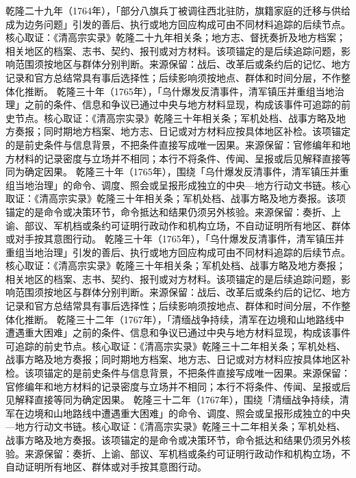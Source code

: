 乾隆二十九年（1764年），「部分八旗兵丁被调往西北驻防，旗籍家庭的迁移与供给成为边务问题」引发的善后、执行或地方回应构成可由不同材料追踪的后续节点。核心取证：《清高宗实录》乾隆二十九年相关条；地方志、督抚奏折及地方档案；相关地区的档案、志书、契约、报刊或对方材料。该项锚定的是后续追踪问题，影响范围须按地区与群体分别判断。来源保留：战后、改革后或条约后的记忆、地方记录和官方总结常具有事后选择性；后续影响须按地点、群体和时间分层，不作整体化推断。
乾隆三十年（1765年），「乌什爆发反清事件，清军镇压并重组当地治理」之前的条件、信息和争议已通过中央与地方材料显现，构成该事件可追踪的前史节点。核心取证：《清高宗实录》乾隆三十年相关条；军机处档、战事方略及地方奏报；同时期地方档案、地方志、日记或对方材料应按具体地区补检。该项锚定的是前史条件与信息背景，不把条件直接写成唯一因果。来源保留：官修编年和地方材料的记录密度与立场并不相同；本行不将条件、传闻、呈报或后见解释直接等同为确定因果。
乾隆三十年（1765年），围绕「乌什爆发反清事件，清军镇压并重组当地治理」的命令、调度、照会或呈报形成独立的中央—地方行动文书链。核心取证：《清高宗实录》乾隆三十年相关条；军机处档、战事方略及地方奏报。该项锚定的是命令或决策环节，命令抵达和结果仍须另外核验。来源保留：奏折、上谕、部议、军机档或条约可证明行政动作和机构立场，不自动证明所有地区、群体或对手按其意图行动。
乾隆三十年（1765年），「乌什爆发反清事件，清军镇压并重组当地治理」引发的善后、执行或地方回应构成可由不同材料追踪的后续节点。核心取证：《清高宗实录》乾隆三十年相关条；军机处档、战事方略及地方奏报；相关地区的档案、志书、契约、报刊或对方材料。该项锚定的是后续追踪问题，影响范围须按地区与群体分别判断。来源保留：战后、改革后或条约后的记忆、地方记录和官方总结常具有事后选择性；后续影响须按地点、群体和时间分层，不作整体化推断。
乾隆三十二年（1767年），「清缅战争持续，清军在边境和山地路线中遭遇重大困难」之前的条件、信息和争议已通过中央与地方材料显现，构成该事件可追踪的前史节点。核心取证：《清高宗实录》乾隆三十二年相关条；军机处档、战事方略及地方奏报；同时期地方档案、地方志、日记或对方材料应按具体地区补检。该项锚定的是前史条件与信息背景，不把条件直接写成唯一因果。来源保留：官修编年和地方材料的记录密度与立场并不相同；本行不将条件、传闻、呈报或后见解释直接等同为确定因果。
乾隆三十二年（1767年），围绕「清缅战争持续，清军在边境和山地路线中遭遇重大困难」的命令、调度、照会或呈报形成独立的中央—地方行动文书链。核心取证：《清高宗实录》乾隆三十二年相关条；军机处档、战事方略及地方奏报。该项锚定的是命令或决策环节，命令抵达和结果仍须另外核验。来源保留：奏折、上谕、部议、军机档或条约可证明行政动作和机构立场，不自动证明所有地区、群体或对手按其意图行动。
